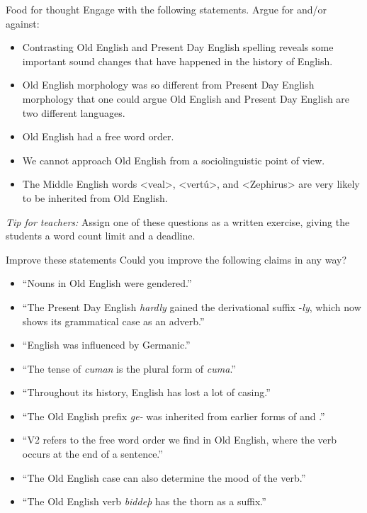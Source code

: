 \begin{exercises}{Food for thought}
Engage with the following statements. Argue for and/or against:

\begin{itemize}
  \item Contrasting Old English and Present Day English spelling reveals some important sound changes that have happened in the history of English.
  \item Old English morphology was so different from Present Day English morphology that one could argue Old English and Present Day English are two different languages.
  \item Old English had a free word order.
  \item We cannot approach Old English from a sociolinguistic point of view.

  \newpage
  \item The Middle English words <veal>, <vertú>, and <Zephirus> are very likely to be inherited from Old English.
\end{itemize}

\noindent \emph{Tip for teachers:} Assign one of these questions as a written exercise, giving the students a word count limit and a deadline.

\end{exercises}

\begin{exercises}{Improve these statements}\label{ex-OE-statements}
Could you improve the following claims in any way?
\begin{itemize}
  \item ``Nouns in Old English were gendered.''
  \item ``The Present Day English \textit{hardly} gained the derivational suffix -\textit{ly}, which now shows its grammatical case as an adverb.''
  \item ``English was influenced by Germanic.''
  \item ``The tense of \textit{cuman} is the plural form of \textit{cuma}.''
  \item ``Throughout its history, English has lost a lot of casing.''
  \item ``The Old English prefix \textit{ge-} was inherited from earlier forms of  and .''
  \item ``V2 refers to the free word order we find in Old English, where the verb occurs at the end of a sentence.''
  \item ``The Old English case can also determine the mood of the verb.''
  \item ``The Old English verb \textit{biddeþ} has the thorn as a suffix.''
\end{itemize}
\end{exercises}


